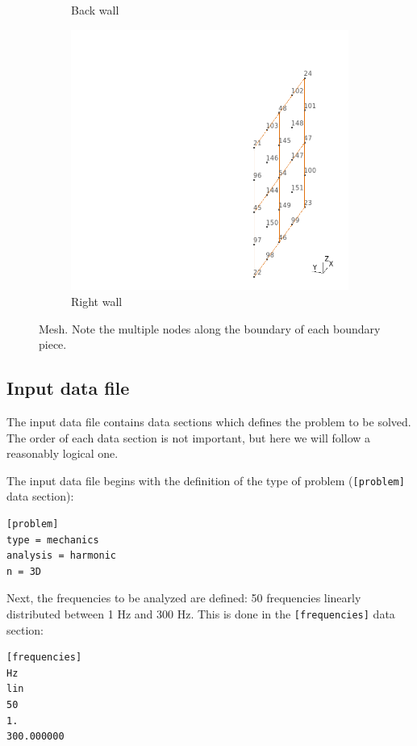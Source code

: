 \documentclass[a4]{article}
\begin{document}
\begin{figure}
\begin{subfigure}[b]{0.48\textwidth}
    \caption{Back wall}
    \label{fig:g3}
  \end{subfigure}
  \hfill
  \begin{subfigure}[b]{0.48\textwidth}
    \centering
    \includegraphics[width=\textwidth]{mesh_4.png}
    \caption{Right wall}
    \label{fig:g5}
  \end{subfigure}  
  \caption{Mesh. Note the multiple nodes along the boundary of each boundary piece.}
  \label{fig:geometry_partition}
\end{figure}

\subsection{Input data file}

The input data file contains data sections which defines the problem to be solved. The order of each data section is not important, but here we will follow a reasonably logical one.

The input data file begins with the definition of the type of problem (\texttt{[problem]} data section):
\begin{Verbatim}[frame=single, fontsize=\small, label=room.dat]
[problem]
type = mechanics
analysis = harmonic
n = 3D
\end{Verbatim}

Next, the frequencies to be analyzed are defined: 50 frequencies linearly distributed between 1 Hz and 300 Hz. This is done in the \texttt{[frequencies]} data section:
\begin{Verbatim}[frame=single, fontsize=\small, label=room.dat]
[frequencies]
Hz
lin
50
1.
300.000000
\end{Verbatim}
\end{document}
